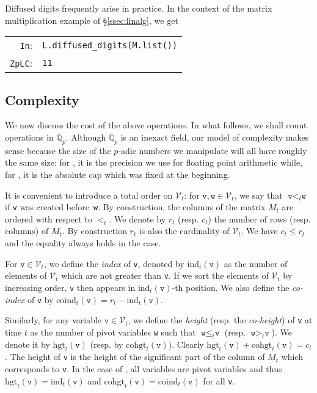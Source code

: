 \documentclass[sigconf]{acmart}
\newcommand{\Q}{\mathbb Q}
\newcommand{\Qp}{\Q_p}
\newcommand{\calV}{\mathcal{V}}
\newcommand{\ttv}{\texttt{v}\xspace}
\newcommand{\ttw}{\texttt{w}\xspace}
\newcommand{\ZpLC}{\text{\color{output} \rm \tt ZpLC}\xspace}
\newcommand{\ZpLF}{\text{\color{output} \rm \tt ZpLF}\xspace}
\newcommand{\ind}{\text{ind}}
\newcommand{\coind}{\text{coind}}
\newcommand{\hgt}{\text{hgt}}
\newcommand{\cohgt}{\text{cohgt}}
\newcommand{\cIn}{{\color{input} \tt \phantom{Zp}In}:}
\newcommand{\cZpLC}{{\color{output} \tt ZpLC}:}
\theoremstyle{definition}
\begin{document}
Diffused digits frequently arise in practice.  In the context of the matrix multiplication
example of \S \ref{ssec:linalg}, we get

\smallskip

{\noindent \small
\begin{tabular}{rl}
\cIn & \verb?L.?{\color{method}\verb?diffused_digits?}\verb?(M.?{\color{method}\verb?list?}\verb?())? \\
\cZpLC & \verb?11? \\
\end{tabular}}

\smallskip

\subsection{Complexity}
\label{ssec:complexity}

We now discuss the cost of the above operations.
In what follows, we shall count operations in $\Qp$. Although $\Qp$
is an inexact field, our model of complexity makes sense because the
size of the $p$-adic numbers we manipulate will all have roughly the
same size: for \ZpLF, it is the precision we use for floating point 
arithmetic while, for \ZpLC, it is the absolute cap which
was fixed at the beginning.

It is convenient to introduce a total order on $\calV_t$: for $\ttv, 
\ttw \in \calV_t$, we say that $\ttv <_t \ttw$ if \ttv was created 
before~\ttw. By construction, the columns of the matrix $M_t$ are 
ordered with respect to $<_t$. We denote by $r_t$ (resp. $c_t$) the
number of rows (resp. columns) of $M_t$. By construction $r_t$ is
also the cardinality of $\calV_t$. We have $c_t \leq r_t$ and the 
equality always holds in the \ZpLC case.

For $\ttv \in \calV_t$, we define the \emph{index} of \ttv, denoted by 
$\ind_t(\ttv)$ as the number of elements of $\calV_t$ which are not 
greater than \ttv. If we sort the elements of $\calV_t$ by increasing 
order, \ttv then appears in $\ind_t(\ttv)$-th position.
We also define the \emph{co-index} of \ttv by
$\coind_t(\ttv) = r_t - \ind_t(\ttv)$.

Similarly, for any variable $\ttv \in \calV_t$, we define the 
\emph{height} (resp. the \emph{co-height}) of \ttv at time $t$ as the 
number of pivot variables \ttw such that $\ttw \leq_t \ttv$ (resp. 
$\ttw >_t \ttv$). We denote it by $\hgt_t(\ttv)$ (resp. by 
$\cohgt_t(\ttv)$). Clearly $\hgt_t(\ttv) + \cohgt_t(\ttv) = c_t$.
The height of \ttv is the height of the significant 
part of the column of $M_t$ which corresponds to \ttv. In the case of
\ZpLC, all variables are pivot variables and thus $\hgt_t(\ttv) = 
\ind_t(\ttv)$ and $\cohgt_t(\ttv) = \coind_t(\ttv)$ for all \ttv.
\end{document}
